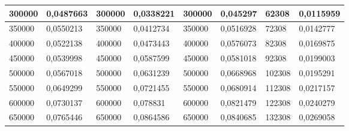\documentclass[11pt,openany]{book}
\begin{document}
\begin{table}[!ht]
\begin{tabular}{|l|l|l|l|l|l|l|l|}
        300000                                            & 0,0487663                                          & 300000                                              & 0,0338221                                           & 300000          & 0,045297        & 62308           & 0,0115959       \\ \hline
        350000                                            & 0,0550213                                          & 350000                                              & 0,0412734                                           & 350000          & 0,0516928       & 72308           & 0,0142777       \\ \hline
        400000                                            & 0,0522138                                          & 400000                                              & 0,0473443                                           & 400000          & 0,0576073       & 82308           & 0,0169875       \\ \hline
        450000                                            & 0,0539998                                          & 450000                                              & 0,0587599                                           & 450000          & 0,0581018       & 92308           & 0,0199003       \\ \hline
        500000                                            & 0,0567018                                          & 500000                                              & 0,0631239                                           & 500000          & 0,0668968       & 102308          & 0,0195291       \\ \hline
        550000                                            & 0,0649299                                          & 550000                                              & 0,0721455                                           & 550000          & 0,0680914       & 112308          & 0,0217157       \\ \hline
        600000                                            & 0,0730137                                          & 600000                                              & 0,078831                                            & 600000          & 0,0821479       & 122308          & 0,0240279       \\ \hline
        650000                                            & 0,0765446                                          & 650000                                              & 0,0864586                                           & 650000          & 0,0840685       & 132308          & 0,0269058       \\ \hline

\end{tabular}
\end{table}
\end{document}
